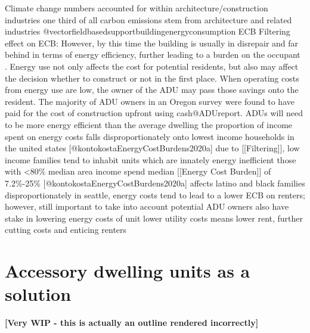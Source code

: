 Climate change numbers accounted for within architecture/construction industries
one third of all carbon emissions stem from architecture and related industries @vectorfieldbasedsupportbuildingenergyconsumption
ECB
Filtering effect on ECB: 
However, by this time the building is usually in disrepair and far behind in terms of energy efficiency, further leading to a burden on the occupant \cite{kontokostaEnergyCostBurdens2020a}. 
Energy use not only affects the cost for potential residents, but also may affect the decision whether to construct or not in the first place. When operating costs from energy use are low, the owner of the ADU may pass those savings onto the resident. The majority of ADU owners in an Oregon survey were found to have paid for the cost of construction upfront using cash@ADUreport.
ADUs will need to be more energy efficient than the average dwelling
the proportion of income spent on energy costs falls disproportionately onto lowest income households in the united states [@kontokostaEnergyCostBurdens2020a]
due to [[Filtering]], low income families tend to inhabit units which are innately energy inefficient
those with <80\% median area income spend median [[Energy Cost Burden]] of 7.2\%-25\% [@kontokostaEnergyCostBurdens2020a]
affects latino and black families disproportionately
in seattle, energy costs tend to lead to a lower ECB on renters; however, still important to take into account
potential ADU owners also have stake in lowering energy costs of unit
lower utility costs means lower rent, further cutting costs and enticing renters

\section{Accessory dwelling units as a solution}

\textbf{[Very WIP - this is actually an outline rendered incorrectly]}

